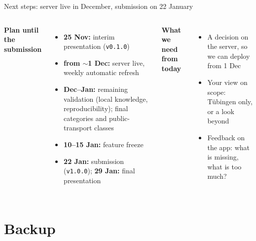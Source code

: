 \documentclass[aspectratio=169,10pt]{beamer}
\begin{document}
\begin{frame}{Next steps: server live in December, submission on 22 January}
  \begin{columns}[T,onlytextwidth]
      \textbf{Plan until the submission}
      \begin{itemize}\footnotesize
        \item \textbf{25 Nov:} interim presentation (\texttt{v0.1.0})
        \item \textbf{from $\sim$1 Dec:} server live, weekly automatic refresh
        \item \textbf{Dec--Jan:} remaining validation (local knowledge, reproducibility);
              final categories and public-transport classes
        \item \textbf{10--15 Jan:} feature freeze
        \item \textbf{22 Jan:} submission (\texttt{v1.0.0}); \textbf{29 Jan:} final
              presentation
      \end{itemize}
      \textbf{What we need from today}
      \begin{itemize}\footnotesize
        \item A decision on the server, so we can deploy from 1 Dec
        \item Your view on scope: Tübingen only, or a look beyond
        \item Feedback on the app: what is missing, what is too much?
      \end{itemize}
  \end{columns}
\end{frame}

\backupslides
\section*{Backup}
\end{document}
